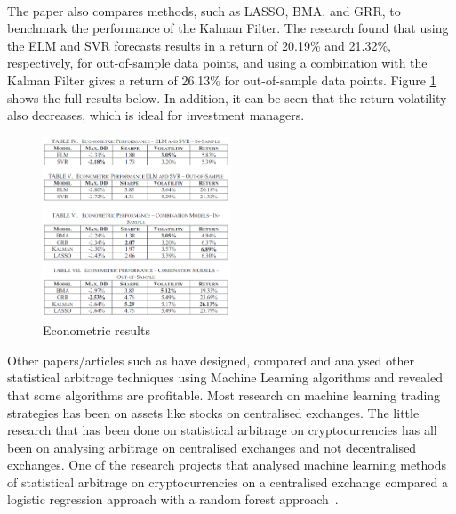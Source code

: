 \\[3mm]
\noindent The paper also compares methods, such as LASSO, BMA, and GRR, to benchmark the performance of the Kalman Filter. The research found that using the ELM and SVR forecasts results in a return of 20.19\% and 21.32\%, respectively, for out-of-sample data points, and using a combination with the Kalman Filter gives a return of 26.13\% for out-of-sample data points. Figure \ref{fig:kalman_ml_results} shows the full results below. In addition, it can be seen that the return volatility also decreases, which is ideal for investment managers.
\begin{figure}[htb!]
    \centering
    \includegraphics[width=0.5\textwidth]{background/Images/kalman_ml_results.png}
    \caption{Econometric results~\cite{6974093}}
    \label{fig:kalman_ml_results}
\end{figure}

\noindent Other papers/articles such as \cite{KRAUSS2017689, alma991000475380901591, jrfm12010031} have designed, compared and analysed other statistical arbitrage techniques using Machine Learning algorithms and revealed that some algorithms are profitable. Most research on machine learning trading strategies has been on assets like stocks on centralised exchanges. The little research that has been done on statistical arbitrage on cryptocurrencies has all been on analysing arbitrage on centralised exchanges and not decentralised exchanges. One of the research projects that analysed machine learning methods of statistical arbitrage on cryptocurrencies on a centralised exchange compared a logistic regression approach with a random forest approach~\cite{jrfm12010031}. 


